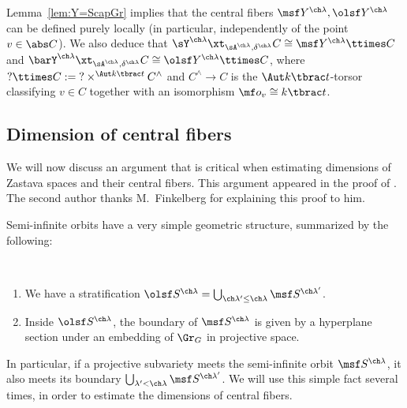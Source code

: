\subsubsection{} \label{sect:YttimesC}
Lemma~\ref{lem:Y=ScapGr} implies that
the central fibers $\msf Y^{\ch\lambda}, \olsf Y^{\ch\lambda}$
can be defined purely locally (in particular, independently of
the point $v\in \abs C$).
We also deduce that $\sY^{\ch\lambda} \xt_{\sA^{\ch\lambda},\delta^{\ch\lambda}} C
\cong \msf Y^{\ch\lambda} \ttimes C$ and
$\barY^{\ch\lambda} \xt_{\sA^{\ch\lambda},\delta^{\ch\lambda}} C \cong \olsf Y^{\ch\lambda} \ttimes C$,
where $? \ttimes C := {?}\times^{\Aut k\tbrac t} C^\wedge $
and $C^\wedge \to C$ is the $\Aut k\tbrac t$-torsor classifying $v\in C$
together with an isomorphism $\mf o_v \cong k\tbrac t$.


\subsection{Dimension of central fibers}

We will now discuss an argument that is critical when estimating dimensions of Zastava spaces and their central fibers. This argument appeared in the proof
of \cite[Theorem 3.2]{MV}. The second author thanks M.~Finkelberg for
explaining this proof to him.

Semi-infinite orbits have a very simple geometric structure, summarized by the following:
\begin{prop}
\notready  \label{prop:Shyperplane}
\

\begin{enumerate}
\item We have a stratification
$\olsf S^{\ch\lambda} = \bigcup_{\ch\lambda' \le \ch\lambda} \msf S^{\ch\lambda'}$.

\item
Inside $\olsf S^{\ch\lambda}$, the boundary of $\msf S^{\ch\lambda}$
is given by a hyperplane section under an embedding of $\Gr_G$ in projective space.
\end{enumerate}
\end{prop}



In particular, if a projective subvariety meets the semi-infinite orbit $\msf S^{\ch\lambda}$, it also meets its boundary $\bigcup_{\lambda' < \ch\lambda}  \msf S^{\ch\lambda'}$. We will use this simple fact several times, in order to estimate the dimensions of central fibers.



